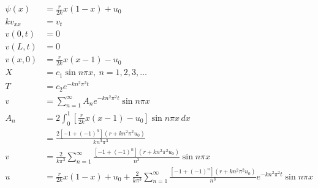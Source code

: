 \documentclass{article}
\begin{document}
\begin{align*}
  \psi(x)      & = \frac{r}{2 k} x (1 - x) + u_0                                                                                                                         \\
  k v_{x x}    & = v_t                                                                                                                                                   \\
  v(0, t)      & = 0                                                                                                                                                     \\
  v(L, t)      & = 0                                                                                                                                                     \\
  v(x, 0)      & = \frac{r}{2 k} x (x - 1) - u_0                                                                                                                         \\
  X            & = c_1 \sin n \pi x,\ n = 1, 2, 3, \ldots                                                                                                                \\
  T            & = c_2 e^{-k n^2 \pi^2 t}                                                                                                                                \\
  v            & = \sum_{n = 1}^\infty A_n e^{-k n^2 \pi^2 t} \sin n \pi x                                                                                               \\
  A_n          & = 2 \int_0^1 \left[ \frac{r}{2 k} x (x - 1) - u_0 \right] \sin n \pi x \,d x                                                                            \\
               & = \frac{2 [-1 + (-1)^n] (r + k n^2 \pi^2 u_0)}{k n^3 \pi^3}                                                                                             \\
  v            & = \frac{2}{k \pi^3} \sum_{n = 1}^\infty \frac{[-1 + (-1)^n] (r + k n^2 \pi^2 u_0)}{n^3} \sin n \pi x                                                    \\
  u            & = \frac{r}{2 k} x (1 - x) + u_0 + \frac{2}{k \pi^3} \sum_{n = 1}^\infty \frac{[-1 + (-1)^n] (r + k n^2 \pi^2 u_0)}{n^3} e^{-k n^2 \pi^2 t} \sin n \pi x
\end{align*}

\setcounter{subsubsection}{6}
\end{document}
